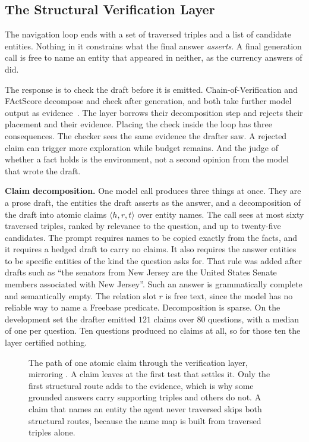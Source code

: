 \subsection{The Structural Verification Layer}\label{sec:verification}

The navigation loop ends with a set of traversed triples and a list of candidate
entities. Nothing in it constrains what the final answer \emph{asserts}. A final
generation call is free to name an entity that appeared in neither, as the
currency answers of  did.

The response is to check the draft before it is emitted. Chain-of-Verification
and FActScore decompose and check after generation, and both take further model
output as evidence~\cite{dhuliawala2024chain,min2023factscore}. The layer
borrows their decomposition step and rejects their placement and their evidence.
Placing the check inside the loop has three consequences. The checker sees the
same evidence the drafter saw. A rejected claim can trigger more exploration
while budget remains. And the judge of whether a fact holds is the environment,
not a second opinion from the model that wrote the draft.

\textbf{Claim decomposition.} One model call produces three things at once. They
are a prose draft, the entities the draft asserts as the answer, and a
decomposition of the draft into atomic claims $\langle h, r, t \rangle$ over
entity names. The call sees at most sixty traversed triples, ranked by relevance
to the question, and up to twenty-five candidates. The prompt requires names to
be copied exactly from the facts, and it requires a hedged draft to carry no
claims. It also requires the answer entities to be specific entities of the kind
the question asks for. That rule was added after drafts such as ``the senators
from New Jersey are the United States Senate members associated with New
Jersey''. Such an answer is grammatically complete and semantically empty. The
relation slot $r$ is free text, since the model has no reliable way to name a
Freebase predicate. Decomposition is sparse. On the development set the drafter
emitted $121$ claims over $80$ questions, with a median of one per question. Ten
questions produced no claims at all, so for those ten the layer certified
nothing.

\begin{figure}[!t]
\centering

\caption{The path of one atomic claim through the verification layer, mirroring
  . A claim leaves at the first test that settles it. Only the
  first structural route adds to the evidence, which is why some grounded
  answers carry supporting triples and others do not. A claim that names an
  entity the agent never traversed skips both structural routes, because the
  name map is built from traversed triples alone.}
\label{fig:claim}
\end{figure}

